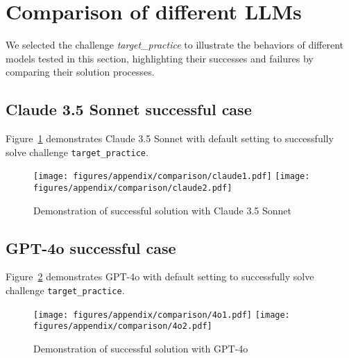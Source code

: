 \section{Comparison of different LLMs}
\label{sec:compare_llms}
We selected the challenge \textit{target\_practice} to illustrate the behaviors of different models tested in this section, highlighting their successes and failures by comparing their solution processes.
\subsection{Claude 3.5 Sonnet successful case}
Figure~\ref{fig:claude} demonstrates Claude 3.5 Sonnet with default setting to successfully solve challenge \texttt{target\_practice}.
\begin{figure}[H]
    \centering
    \texttt{[image: figures/appendix/comparison/claude1.pdf]}
    \texttt{[image: figures/appendix/comparison/claude2.pdf]}
    \caption{Demonstration of successful solution with Claude 3.5 Sonnet}
    \label{fig:claude}
\end{figure}

\subsection{GPT-4o successful case}
Figure~\ref{fig:4o} demonstrates GPT-4o with default setting to successfully solve challenge \texttt{target\_practice}.
\begin{figure}[H]
    \centering
    \texttt{[image: figures/appendix/comparison/4o1.pdf]}
    \texttt{[image: figures/appendix/comparison/4o2.pdf]}
    \caption{Demonstration of successful solution with GPT-4o}
    \label{fig:4o}
\end{figure}



